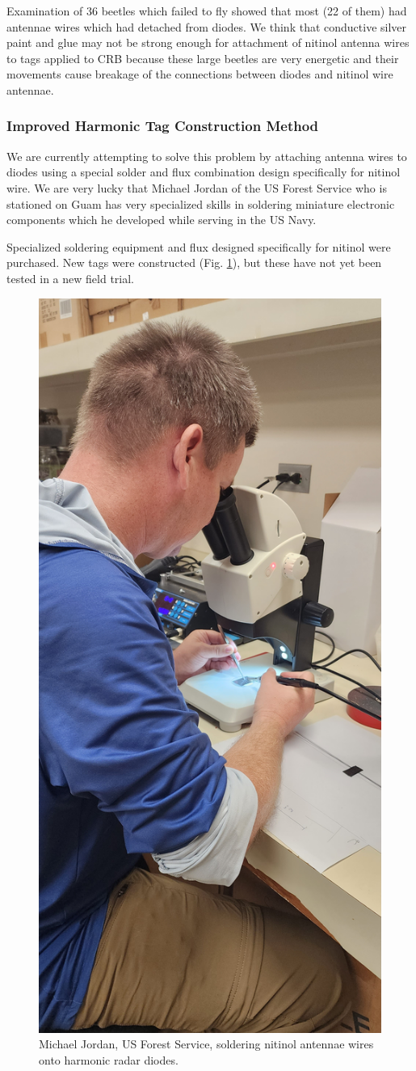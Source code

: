 \documentclass[12pt,letterpaper,english,bibliography=totocnumbered, abstract=on]{scrartcl}
\begin{document}
Examination of 36 beetles which failed to fly showed that most (22 of them) had antennae wires which had detached from diodes. We think that conductive silver paint and glue may not be strong enough for attachment of nitinol antenna wires to tags applied to CRB because these large beetles are very energetic and their movements cause breakage of the connections between diodes and nitinol wire antennae. 

\subsubsection{Improved Harmonic Tag Construction Method}

We are currently attempting to solve this problem by attaching antenna wires to diodes using a special solder and flux combination design specifically for nitinol wire. We are very lucky that Michael Jordan of the US Forest Service who is stationed on Guam has very specialized skills in soldering miniature electronic components which he developed while serving in the US Navy.

Specialized soldering equipment and flux designed specifically for nitinol were purchased. New tags were constructed (Fig. \ref{fig:harmonicradartags}), but these have not yet been tested in a new field trial.

\begin{figure}[H]
	\centering
	\includegraphics[angle=-90,origin=c,width=0.6\linewidth]{images/harmonic_radar_tags}
	\caption{Michael Jordan, US Forest Service, soldering nitinol antennae wires onto harmonic radar diodes.}
	\label{fig:harmonicradartags}
\end{figure}
\end{document}
